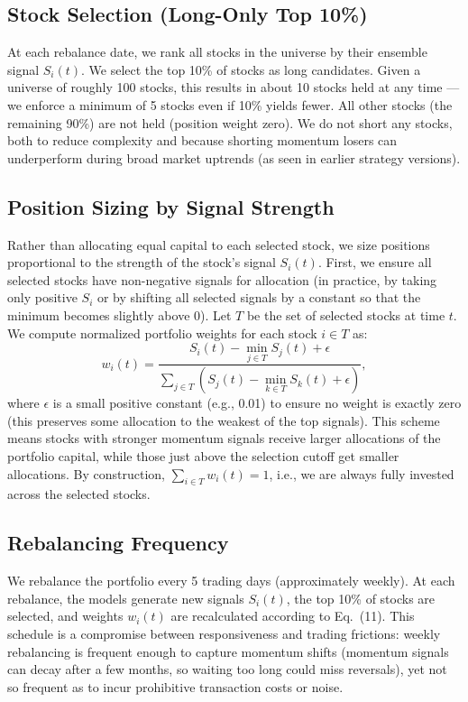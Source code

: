 \documentclass[conference]{IEEEtran}
\begin{document}
\subsection{Stock Selection (Long-Only Top 10\%)}
At each rebalance date, we rank all stocks in the universe by their ensemble signal $S_i(t)$. We select the top 10\% of stocks as long candidates. Given a universe of roughly 100 stocks, this results in about 10 stocks held at any time --- we enforce a minimum of 5 stocks even if 10\% yields fewer. All other stocks (the remaining 90\%) are not held (position weight zero). We do not short any stocks, both to reduce complexity and because shorting momentum losers can underperform during broad market uptrends (as seen in earlier strategy versions).

\subsection{Position Sizing by Signal Strength}
Rather than allocating equal capital to each selected stock, we size positions proportional to the strength of the stock's signal $S_i(t)$. First, we ensure all selected stocks have non-negative signals for allocation (in practice, by taking only positive $S_i$ or by shifting all selected signals by a constant so that the minimum becomes slightly above 0). Let $T$ be the set of selected stocks at time $t$. We compute normalized portfolio weights for each stock $i \in T$ as:
\begin{equation}
w_i(t) = \frac{S_i(t) - \min_{j \in T} S_j(t) + \epsilon}{\sum_{j \in T}(S_j(t) - \min_{k \in T} S_k(t) + \epsilon)},
\end{equation}
where $\epsilon$ is a small positive constant (e.g., 0.01) to ensure no weight is exactly zero (this preserves some allocation to the weakest of the top signals). This scheme means stocks with stronger momentum signals receive larger allocations of the portfolio capital, while those just above the selection cutoff get smaller allocations. By construction, $\sum_{i \in T} w_i(t) = 1$, i.e., we are always fully invested across the selected stocks.

\subsection{Rebalancing Frequency}
We rebalance the portfolio every 5 trading days (approximately weekly). At each rebalance, the models generate new signals $S_i(t)$, the top 10\% of stocks are selected, and weights $w_i(t)$ are recalculated according to Eq.~(11). This schedule is a compromise between responsiveness and trading frictions: weekly rebalancing is frequent enough to capture momentum shifts (momentum signals can decay after a few months, so waiting too long could miss reversals), yet not so frequent as to incur prohibitive transaction costs or noise.
\end{document}
